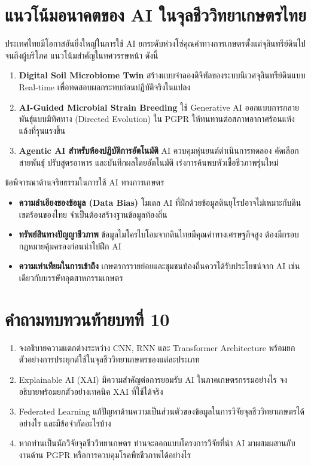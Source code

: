 \section{แนวโน้มอนาคตของ AI ในจุลชีววิทยาเกษตรไทย}

ประเทศไทยมีโอกาสอันยิ่งใหญ่ในการใช้ AI ยกระดับห่วงโซ่คุณค่าทางการเกษตรตั้งแต่จุลินทรีย์ดินไปจนถึงผู้บริโภค แนวโน้มสำคัญในทศวรรษหน้า ดังนี้
\begin{enumerate}
    \item \textbf{Digital Soil Microbiome Twin} สร้างแบบจำลองดิจิทัลของระบบนิเวศจุลินทรีย์ดินแบบ Real-time เพื่อทดสอบผลกระทบก่อนปฏิบัติจริงในแปลง
    \item \textbf{AI-Guided Microbial Strain Breeding} ใช้ Generative AI ออกแบบการกลายพันธุ์แบบมีทิศทาง (Directed Evolution) ใน PGPR ให้ทนทานต่อสภาพอากาศร้อนแห้งแล้งที่รุนแรงขึ้น
    \item \textbf{Agentic AI สำหรับห้องปฏิบัติการอัตโนมัติ} AI ควบคุมหุ่นยนต์ดำเนินการทดลอง คัดเลือกสายพันธุ์ ปรับสูตรอาหาร และบันทึกผลโดยอัตโนมัติ เร่งการค้นพบหัวเชื้อชีวภาพรุ่นใหม่
\end{enumerate}

\begin{agribox}{ข้อพิจารณาด้านจริยธรรมในการใช้ AI ทางการเกษตร}
\begin{itemize}
    \item \textbf{ความลำเอียงของข้อมูล (Data Bias)} โมเดล AI ที่ฝึกด้วยข้อมูลดินยุโรปอาจไม่เหมาะกับดินเขตร้อนของไทย จำเป็นต้องสร้างฐานข้อมูลท้องถิ่น
    \item \textbf{ทรัพย์สินทางปัญญาชีวภาพ} ข้อมูลไมโครไบโอมจากดินไทยมีคุณค่าทางเศรษฐกิจสูง ต้องมีกรอบกฎหมายคุ้มครองก่อนนำไปฝึก AI
    \item \textbf{ความเท่าเทียมในการเข้าถึง} เกษตรกรรายย่อยและชุมชนท้องถิ่นควรได้รับประโยชน์จาก AI เช่นเดียวกับบรรษัทอุตสาหกรรมเกษตร
\end{itemize}
\end{agribox}

\section*{คำถามทบทวนท้ายบทที่ 10}
\begin{enumerate}
    \item จงอธิบายความแตกต่างระหว่าง CNN, RNN และ Transformer Architecture พร้อมยกตัวอย่างการประยุกต์ใช้ในจุลชีววิทยาเกษตรของแต่ละประเภท
    \item Explainable AI (XAI) มีความสำคัญต่อการยอมรับ AI ในภาคเกษตรกรรมอย่างไร จงอธิบายพร้อมยกตัวอย่างเทคนิค XAI ที่ใช้ได้จริง
    \item Federated Learning แก้ปัญหาด้านความเป็นส่วนตัวของข้อมูลในการวิจัยจุลชีววิทยาเกษตรได้อย่างไร และมีข้อจำกัดอะไรบ้าง
    \item หากท่านเป็นนักวิจัยจุลชีววิทยาเกษตร ท่านจะออกแบบโครงการวิจัยที่นำ AI มาผสมผสานกับงานด้าน PGPR หรือการควบคุมโรคพืชชีวภาพได้อย่างไร
\end{enumerate}

\clearpage
